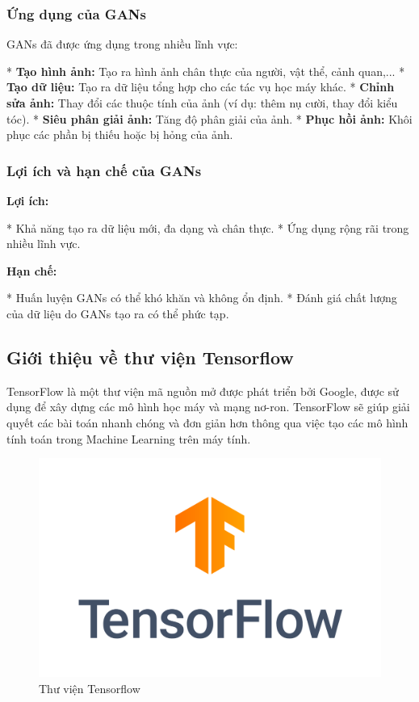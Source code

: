 \subsubsection{Ứng dụng của GANs}

GANs đã được ứng dụng trong nhiều lĩnh vực:

* \textbf{Tạo hình ảnh:} Tạo ra hình ảnh chân thực của người, vật thể, cảnh quan,...
* \textbf{Tạo dữ liệu:} Tạo ra dữ liệu tổng hợp cho các tác vụ học máy khác.
* \textbf{Chỉnh sửa ảnh:}  Thay đổi các thuộc tính của ảnh (ví dụ: thêm nụ cười, thay đổi kiểu tóc).
* \textbf{Siêu phân giải ảnh:} Tăng độ phân giải của ảnh.
* \textbf{Phục hồi ảnh:} Khôi phục các phần bị thiếu hoặc bị hỏng của ảnh.

\subsubsection{Lợi ích và hạn chế của GANs}

\textbf{Lợi ích:}

* Khả năng tạo ra dữ liệu mới, đa dạng và chân thực.
* Ứng dụng rộng rãi trong nhiều lĩnh vực.

\textbf{Hạn chế:}

* Huấn luyện GANs có thể khó khăn và không ổn định.
* Đánh giá chất lượng của dữ liệu do GANs tạo ra có thể phức tạp.

\subsection{Giới thiệu về thư viện Tensorflow}
\indent TensorFlow là một thư viện mã nguồn mở được phát triển bởi Google, được sử dụng để xây dựng các mô hình học máy và mạng nơ-ron. TensorFlow sẽ giúp giải quyết các bài toán nhanh chóng và đơn giản hơn thông qua việc tạo các mô hình tính toán trong Machine Learning trên máy tính.
\begin{figure}[H]
    \centering
    \includegraphics[width=\textwidth,height=\textheight,keepaspectratio]{Images/Theoretical basis/TensorFlow_logo.png}
    \caption{Thư viện Tensorflow}
    \label{fig:enter-label}
\end{figure}
